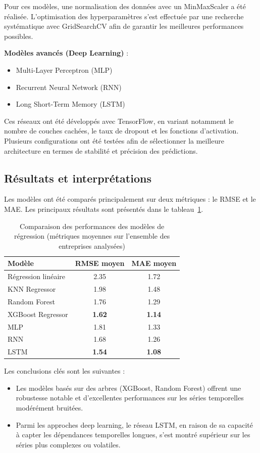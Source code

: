 \documentclass[a4paper,12pt]{article}
\begin{document}
Pour ces modèles, une normalisation des données avec un MinMaxScaler a été réalisée. L'optimisation des hyperparamètres s'est effectuée par une recherche systématique avec GridSearchCV afin de garantir les meilleures performances possibles.

\textbf{Modèles avancés (Deep Learning)} :
\begin{itemize}
    \item Multi-Layer Perceptron (MLP)
    \item Recurrent Neural Network (RNN)
    \item Long Short-Term Memory (LSTM)
\end{itemize}

Ces réseaux ont été développés avec TensorFlow, en variant notamment le nombre de couches cachées, le taux de dropout et les fonctions d'activation. Plusieurs configurations ont été testées afin de sélectionner la meilleure architecture en termes de stabilité et précision des prédictions.

\subsection*{Résultats et interprétations}

Les modèles ont été comparés principalement sur deux métriques : le RMSE et le MAE. Les principaux résultats sont présentés dans le tableau~\ref{tab:regression_perf}.

\begin{table}[h!]
\centering
\begin{tabular}{|l|c|c|}
\hline
\textbf{Modèle} & \textbf{RMSE moyen} & \textbf{MAE moyen} \\
\hline
Régression linéaire & 2.35 & 1.72 \\
KNN Regressor & 1.98 & 1.48 \\
Random Forest & 1.76 & 1.29 \\
XGBoost Regressor & \textbf{1.62} & \textbf{1.14} \\
MLP & 1.81 & 1.33 \\
RNN & 1.68 & 1.26 \\
LSTM & \textbf{1.54} & \textbf{1.08} \\
\hline
\end{tabular}
\caption{Comparaison des performances des modèles de régression (métriques moyennes sur l'ensemble des entreprises analysées)}
\label{tab:regression_perf}
\end{table}

Les conclusions clés sont les suivantes :
\begin{itemize}
    \item Les modèles basés sur des arbres (XGBoost, Random Forest) offrent une robustesse notable et d'excellentes performances sur les séries temporelles modérément bruitées.
    \item Parmi les approches deep learning, le réseau LSTM, en raison de sa capacité à capter les dépendances temporelles longues, s'est montré supérieur sur les séries plus complexes ou volatiles.
\end{itemize}
\end{document}
